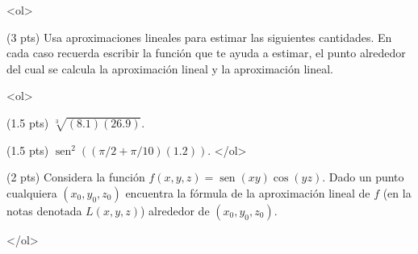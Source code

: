 \documentclass[12pt]{article}
\newcommand{\sen}{\operatorname{sen}}
\begin{document}
\bigskip

            
\bigskip
\bigskip
\bigskip


<ol>


  

  
\item (3 pts) Usa aproximaciones lineales para estimar las siguientes cantidades. En cada caso
  recuerda escribir la función que te ayuda  a estimar, el punto alrededor del cual
  se calcula la aproximación lineal y la aproximación lineal.

  <ol>
  \item(1.5 pts) $\sqrt[3]{(8.1)(26.9)}$.
    \item (1.5 pts) $\sen^2((\pi/2+\pi/10)(1.2))$.
  </ol>



  \vspace{4cm}

\item (2 pts) Considera la función $f(x,y,z)=\sen(xy)\cos(yz)$. Dado un punto cualquiera
  $(x_0,y_0,z_0)$ encuentra la fórmula de la aproximación lineal de $f$ (en la notas
  denotada $L(x,y,z)$) alrededor de $(x_0,y_0,z_0)$.
  
  </ol>


  
\end{document}
